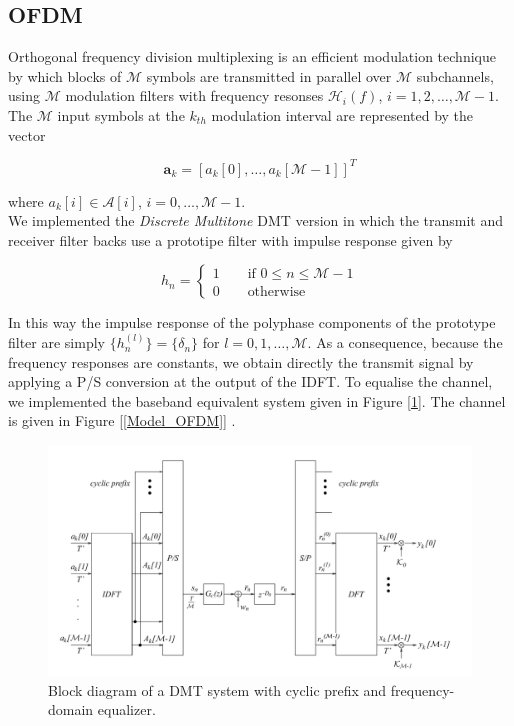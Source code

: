 \documentclass[a4paper, 12pt]{report}
\begin{document}
\clearpage
\subsection*{OFDM}
Orthogonal frequency division multiplexing is an efficient modulation technique by which blocks of $\mathcal{M}$ symbols are transmitted in parallel over $\mathcal{M}$ subchannels, using $\mathcal{M}$ modulation filters with frequency resonses $\mathcal{H}_i(f)$, $i=1,2,\dots,\mathcal{M}-1$. The $\mathcal{M}$ input symbols at the $k_{th}$ modulation interval are represented by the vector

\begin{equation}
\mathbf{a}_k = [a_k[0],\dots,a_k[\mathcal{M}-1]]^T
\end{equation}

where $a_k[i]\in\mathcal{A}[i]$, $i=0,\dots,\mathcal{M}-1$.\\
We implemented the \textit{Discrete Multitone} DMT version in which the transmit and receiver filter backs use a prototipe filter with impulse response given by

\begin{equation}
h_n = \begin{cases}
		1 \quad\quad \text{if } 0\le n\le\mathcal{M}-1 \\
		0 \quad\quad \text{otherwise}
\end{cases}
\end{equation}

In this way the impulse response of the polyphase components of the prototype filter are simply $\{ h_n^(l)\}=\{\delta_n\}$ for $l=0,1,\dots,\mathcal{M}$. As a consequence, because the frequency responses are constants, we obtain directly the transmit signal by applying a P/S conversion at the output of the IDFT. To equalise the channel, we implemented the baseband equivalent system given in Figure [\ref{ofdm}]. The channel is given in Figure [\ref{Model_OFDM}]
.
\begin{figure}[H]
	\centering
	\includegraphics[width=14cm]{OFDM}
	\caption{Block diagram of a DMT system with cyclic prefix and frequency-domain equalizer.}\label{ofdm}
\end{figure}
\end{document}
